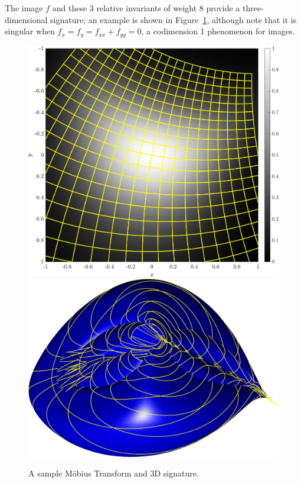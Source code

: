 \documentclass[review,onefignum,onetabnum]{siamonline190516}
\begin{document}
{The image $f$ and these 3 relative invariants of weight 8 provide a three-dimensional signature; an example is shown in Figure~\ref{fig:mobius}, although note that it is singular when $f_x=f_y=f_{xx}+f_{yy}=0$, a codimension 1 phenomenon for images. 





\begin{figure}
\centering
\includegraphics[width=.45\textwidth]{Figs/f_transformed_Mobius.png}
\includegraphics[width=.45\textwidth]{Figs/Mobius_signature.png}
\caption{A sample M\"obius Transform and 3D signature.}
\label{fig:mobius}
\end{figure}

}
\end{document}
